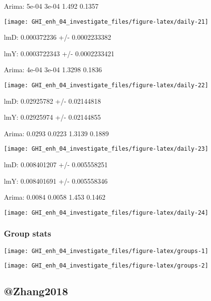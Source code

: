 \documentclass[
  10pt,
  a4paper,oneside]{article}
\begin{document}
Arima: 5e-04 3e-04 1.492 0.1357

\begin{center}\texttt{[image: GHI\_enh\_04\_investigate\_files/figure-latex/daily-21]} \end{center}

lmD: 0.000372236 +/- 0.0002233382

lmY: 0.0003722343 +/- 0.0002233421

Arima: 4e-04 3e-04 1.3298 0.1836

\begin{center}\texttt{[image: GHI\_enh\_04\_investigate\_files/figure-latex/daily-22]} \end{center}

lmD: 0.02925782 +/- 0.02144818

lmY: 0.02925974 +/- 0.02144855

Arima: 0.0293 0.0223 1.3139 0.1889

\begin{center}\texttt{[image: GHI\_enh\_04\_investigate\_files/figure-latex/daily-23]} \end{center}

lmD: 0.008401207 +/- 0.005558251

lmY: 0.008401691 +/- 0.005558346

Arima: 0.0084 0.0058 1.453 0.1462

\begin{center}\texttt{[image: GHI\_enh\_04\_investigate\_files/figure-latex/daily-24]} \end{center}

\newpage
\FloatBarrier

\hypertarget{group-stats}{%
\subsubsection{Group stats}\label{group-stats}}

\begin{center}\texttt{[image: GHI\_enh\_04\_investigate\_files/figure-latex/groups-1]} \end{center}

\begin{center}\texttt{[image: GHI\_enh\_04\_investigate\_files/figure-latex/groups-2]} \end{center}

\hypertarget{zhang2018}{%
\subsection{@Zhang2018}\label{zhang2018}}
\end{document}
